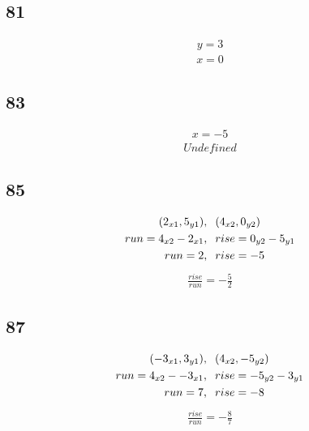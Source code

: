 \documentclass{article}
\begin{document}
    \subsection*{81}
    \begin{align*}
        y = 3
    \end{align*}
    \begin{align*}
        \boxed{x = 0}
    \end{align*}

    \subsection*{83}
    \begin{align*}
        x = -5
    \end{align*}
    \begin{align*}
        \boxed{Undefined}
    \end{align*}

    \subsection*{85}
    \begin{align*}
        (2_{x1}, 5_{y1})&,\hspace{.2cm} (4_{x2}, 0_{y2}) \\
        run = 4_{x2} - 2_{x1}&,\hspace{.2cm}  rise = 0_{y2} - 5_{y1}\\
        run = 2&,\hspace{.2cm} rise =  -5
    \end{align*}
    \begin{align*}
        \boxed{\frac{rise}{run} = -\frac{5}{2}}
    \end{align*}

    \subsection*{87}
    \begin{align*}
    (-3_{x1}, 3_{y1})&,\hspace{.2cm} (4_{x2}, -5_{y2}) \\
    run = 4_{x2} - -3_{x1}&,\hspace{.2cm}  rise =-5_{y2} - 3_{y1}\\
    run = 7&,\hspace{.2cm} rise =  -8
    \end{align*}
    \begin{align*}
        \boxed{\frac{rise}{run} = -\frac{8}{7}}
    \end{align*}
\end{document}
